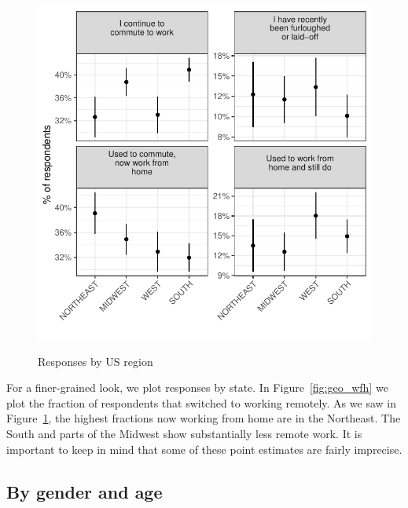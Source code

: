 \documentclass[12pt]{article}
\begin{document}
\begin{figure}
  \caption{Responses by US region} \label{fig:region}
\centering
\begin{minipage}{1.0 \linewidth}
  \includegraphics[width = \linewidth]{plots/region.pdf} \\
  \begin{footnotesize}
    \end{footnotesize}
\end{minipage}
\end{figure} 

For a finer-grained look, we plot responses by state.
In Figure~\ref{fig:geo_wfh} we plot the fraction of respondents that switched to working remotely. 
As we saw in Figure~\ref{fig:region}, the highest fractions now working from home are in the Northeast.
The South and parts of the Midwest show substantially less remote work. 
It is important to keep in mind that some of these point estimates are fairly imprecise.


\subsection{By gender and age} \label{sec:gender}
\end{document}
